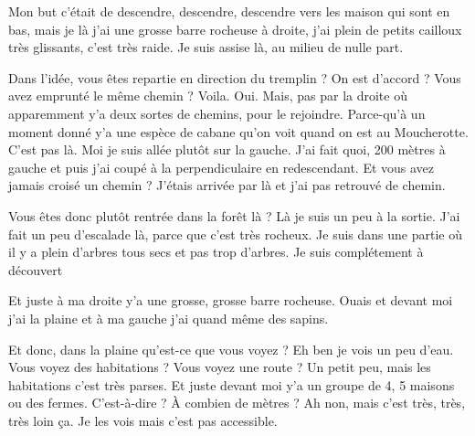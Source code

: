 \begin{dialogue}
  \Req {} Mon but c’était de descendre, descendre, descendre
  vers les maison qui sont en bas,  mais je là j’ai une
  grosse barre rocheuse à droite,  j’ai plein de petits
  cailloux très glissants,  c’est très raide.  Je
  suis assise là, au milieu de nulle part.
\end{dialogue}


\begin{dialogue}
  \Sec {} Dans l’idée, vous êtes repartie en direction du
  tremplin ? On est d’accord ? Vous avez emprunté le même chemin ?
  \Req {} Voila. Oui.  Mais, pas par la droite où
   apparemment y’a deux sortes de chemins, pour le
  rejoindre.  Parce-qu’à un moment donné y’a une espèce de
  cabane qu’on voit quand on est au Moucherotte. C’est pas
  là.  Moi je suis allée plutôt sur la gauche. J’ai fait
  quoi, 200 mètres à gauche et  puis j’ai coupé à la
  perpendiculaire en redescendant.
  \Sec {} Et vous avez jamais croisé un chemin ?
  \Req {} J’étais arrivée par là et j’ai pas retrouvé de
  chemin.
\end{dialogue}

\begin{dialogue}
  \Sec {} Vous êtes donc plutôt rentrée dans la forêt là ?
  \Req {} Là je suis un peu à la sortie.  J’ai fait
  un peu d’escalade là,  parce que c’est très
  rocheux.  Je suis dans une partie où il y a plein d’arbres
  tous secs et pas trop d’arbres. Je suis complétement à découvert
\end{dialogue}


\begin{dialogue}
  \Req {} Et juste à ma droite y’a une grosse, grosse barre
  rocheuse.  Ouais et devant moi j’ai la plaine et
   à ma gauche j’ai quand même des sapins.
\end{dialogue}


\begin{dialogue}
  \Sec {} Et donc, dans la plaine qu’est-ce que vous voyez ?
  \Req {} Eh ben je vois un peu d’eau.
  \Sec {} Vous voyez des habitations ? Vous voyez une route ?
  \Req {} Un petit peu, mais les habitations c’est très
  parses.  Et juste devant moi y’a un groupe de 4, 5 maisons
  ou des fermes.
  \Sec {} C’est-à-dire ? À combien de mètres ?
  \Req {} Ah non, mais c’est très, très, très loin ça. Je les
  vois mais c’est pas accessible.
\end{dialogue}


